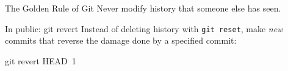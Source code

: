 \begin{frame}{The Golden Rule of Git}
  \huge {
  Never modify history that someone else has seen.
  }
\end{frame}

\begin{frame}[fragile]{In public: git revert}
  Instead of deleting history with \texttt{git reset}, make \emph{new}
  commits that reverse the damage done by a specified commit:

  \begin{gitCommand}git revert HEAD~1\end{gitCommand}
\end{frame}

